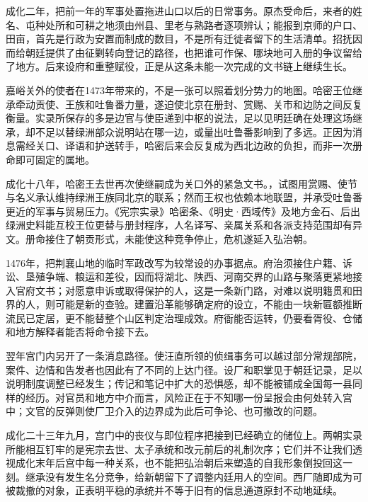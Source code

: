 成化二年，把前一年的军事处置拖进山口以后的日常事务。原杰受命后，来者的姓名、屯种处所和可耕之地须由州县、里老与熟路者逐项辨认；能报到京师的户口、田亩，首先是行政为安置而制成的数目，不是所有迁徙者留下的生活清单。招抚因而给朝廷提供了由征剿转向登记的路径，也把谁可作保、哪块地可入册的争议留给了地方。后来设府和重整赋役，正是从这条未能一次完成的文书链上继续生长。

嘉峪关外的使者在1473年带来的，不是一张可以照着划分势力的地图。哈密王位继承牵动贡使、王族和吐鲁番力量，遂迫使北京在册封、赏赐、关市和边防之间反复衡量。实录所保存的多是边官与使臣递到中枢的说法，足以见明廷确在处理这场继承，却不足以替绿洲部众说明站在哪一边，或量出吐鲁番影响到了多远。正因为消息需经关口、译语和护送转手，哈密后来会反复成为西北边政的负担，而非一次册命即可固定的属地。

成化十八年，哈密王去世再次使继嗣成为关口外的紧急文书。，试图用赏赐、使节与名义承认维持绿洲王族同北京的联系；然而王权也依赖本地联盟，并承受吐鲁番更近的军事与贸易压力。《宪宗实录》哈密条、《明史·西域传》及地方金石、后出绿洲史料能互校王位更替与册封程序，人名译写、亲属关系和各派支持范围却有异文。册命接住了朝贡形式，未能使这种竞争停止，危机遂延入弘治朝。

1476年，把荆襄山地的临时军政改写为较常设的办事据点。府治须接住户籍、诉讼、垦殖争端、粮运和差役，因而将湖北、陕西、河南交界的山路与聚落更紧地接入官府文书；对愿意申诉或取得保护的人，这是一条新门路，对难以说明籍贯和田界的人，则可能是新的查验。建置沿革能够确定府的设立，不能由一块新匾额推断流民已定居，更不能替整个山区判定治理成效。府衙能否运转，仍要看胥役、仓储和地方解释者能否将命令接下去。

翌年宫门内另开了一条消息路径。使汪直所领的侦缉事务可以越过部分常规部院，案件、边情和告发者也因此有了不同的上达门径。设厂和职掌见于朝廷记录，足以说明制度调整已经发生；传记和笔记中扩大的恐惧感，却不能被铺成全国每一县同样的经历。对官员和地方中介而言，风险正在于不知哪一份呈报会由何处转入宫中；文官的反弹则使厂卫介入的边界成为此后可争论、也可撤改的问题。

成化二十三年九月，宫门中的丧仪与即位程序把接到已经确立的储位上。两朝实录所能相互钉牢的是宪宗去世、太子承统和改元前后的礼制次序；它们并不让我们透视成化末年后宫中每一种关系，也不能把弘治朝后来塑造的自我形象倒投回这一刻。继承没有发生名分竞争，给新朝留下了调整内廷用人的空间。西厂随即成为可被裁撤的对象，正表明平稳的承统并不等于旧有的信息通道原封不动地延续。

